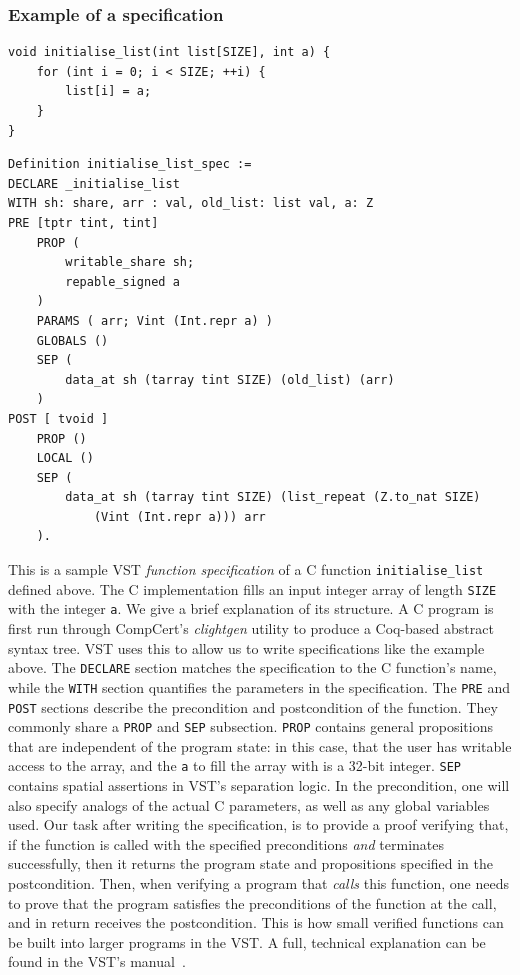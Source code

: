\subsubsection{Example of a specification}
\begin{lstlisting}
void initialise_list(int list[SIZE], int a) {
	for (int i = 0; i < SIZE; ++i) {
		list[i] = a;
	}
}
\end{lstlisting}
\begin{lstlisting}
Definition initialise_list_spec :=
DECLARE _initialise_list
WITH sh: share, arr : val, old_list: list val, a: Z
PRE [tptr tint, tint]
	PROP (
		writable_share sh;
		repable_signed a
	)
	PARAMS ( arr; Vint (Int.repr a) )
	GLOBALS ()
	SEP (
		data_at sh (tarray tint SIZE) (old_list) (arr)
	)
POST [ tvoid ]
	PROP ()
	LOCAL ()
	SEP (
		data_at sh (tarray tint SIZE) (list_repeat (Z.to_nat SIZE)
			(Vint (Int.repr a))) arr
	).
\end{lstlisting}
This is a sample VST \textit{function specification} of a C function \texttt{initialise\_list} defined above. The C implementation fills an input integer array of length \texttt{SIZE} with the integer \texttt{a}. We give a brief explanation of its structure.
\newline\newline
A C program is first run through CompCert's \textit{clightgen} utility to produce a Coq-based abstract syntax tree. VST uses this to allow us to write specifications like the example above. The \texttt{DECLARE} section matches the specification to the C function's name, while the \texttt{WITH} section quantifies the parameters in the specification. The \texttt{PRE} and \texttt{POST} sections describe the precondition and postcondition of the function. They commonly share a \texttt{PROP} and \texttt{SEP} subsection. \texttt{PROP} contains general propositions that are independent of the program state: in this case, that the user has writable access to the array, and the \texttt{a} to fill the array with is a 32-bit integer. \texttt{SEP} contains spatial assertions in VST's separation logic. In the precondition, one will also specify analogs of the actual C parameters, as well as any global variables used.
\newline\newline
Our task after writing the specification, is to provide a proof verifying that, if the function is called with the specified preconditions \textit{and} terminates successfully, then it returns the program state and propositions specified in the postcondition. Then, when verifying a program that \textit{calls} this function, one needs to prove that the program satisfies the preconditions of the function at the call, and in return receives the postcondition. This is how small verified functions can be built into larger programs in the VST.
\newline\newline
A full, technical explanation can be found in the VST's manual~\cite{vcmanual}.
